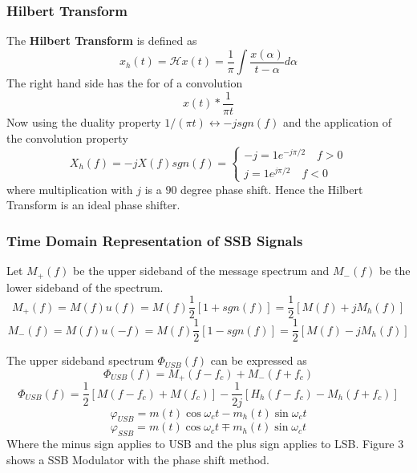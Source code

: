 \documentclass{article}
\begin{document}
    \subsubsection{Hilbert Transform}
    The \textbf{Hilbert Transform} is defined as 
    \begin{equation}
        x_h(t) = \mathcal{H}{x(t)} = \frac{1}{\pi}\int\frac{x(\alpha)}{t-\alpha}d\alpha
    \end{equation}
    The right hand side has the for of a convolution
    \begin{equation}
        x(t) \ast \frac{1}{\pi t}
    \end{equation}
    Now using the duality property $1/(\pi t) \leftrightarrow -jsgn(f)$ and the application of the convolution property
    \begin{equation}
        X_h(f) = -jX(f)sgn(f) = \begin{cases}
                                    -j=1e^{-j\pi/2} \quad f > 0 \\
                                    j= 1e^{j\pi/2} \quad f < 0
                                \end{cases}
    \end{equation}
    where multiplication with $j$ is a $90$ degree phase shift. Hence the Hilbert Transform is an ideal phase shifter.

    \subsubsection{Time Domain Representation of SSB Signals}
    Let $M_+(f)$ be the upper sideband of the message spectrum and $M_-(f)$ be the lower sideband of the spectrum.
    \begin{equation}
        M_+(f) = M(f)u(f) = M(f)\frac{1}{2}[1 + sgn(f)] = \frac{1}{2}[M(f) + jM_h(f)]
    \end{equation}
    \begin{equation}
        M_-(f) = M(f)u(-f) = M(f)\frac{1}{2}[1 - sgn(f)] = \frac{1}{2}[M(f) - jM_h(f)]
    \end{equation}

    The upper sideband spectrum $\Phi_{USB}(f)$ can be expressed as
    \begin{equation}
        \Phi_{USB}(f) = M_+(f-f_c) + M_-(f+f_c)
    \end{equation}
    \begin{equation}
        \Phi_{USB}(f) = \frac{1}{2}[M(f-f_c)+M(f_c)]-\frac{1}{2j}[H_h(f-f_c) - M_h(f+f_c)]
    \end{equation}
    \begin{equation}
        \varphi_{USB} = m(t) \cos\omega_ct-m_h(t)\sin\omega_ct
    \end{equation}
    \begin{equation}
        \varphi_{SSB} = m(t) \cos\omega_ct \mp m_h(t)\sin\omega_ct
    \end{equation}
    Where the minus sign applies to USB and the plus sign applies to LSB. Figure 3 shows a SSB Modulator with the phase shift method.
\end{document}
